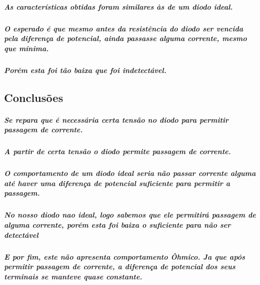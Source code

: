 \documentclass[12pt,twoside, a4paper, twocolumn]{article}
\begin{document}
\subparagraph*{As características obtidas foram similares às de um diodo ideal.}

\subparagraph*{O esperado é que mesmo antes da resistência do diodo ser vencida pela diferença de potencial, ainda passasse alguma corrente, mesmo que mínima. }

\subparagraph*{Porém esta foi tão baixa que foi indetectável.}


\subsection{Conclusões}

\subparagraph*{Se repara que é necessária certa tensão no diodo para permitir passagem de corrente.}

\subparagraph*{A partir de certa tensão o diodo permite passagem de corrente.}

\subparagraph*{O comportamento de um diodo ideal seria não passar corrente alguma até haver uma diferença de potencial suficiente para permitir a passagem.}

\subparagraph*{No nosso diodo nao ideal, logo sabemos que ele permitirá passagem de alguma corrente, porém esta foi baixa o suficiente para não ser detectável}

\subparagraph*{E por fim, este não apresenta comportamento Ôhmico. Ja que após permitir passagem de corrente, a diferença de potencial dos seus terminais se manteve quase constante.}
\end{document}
